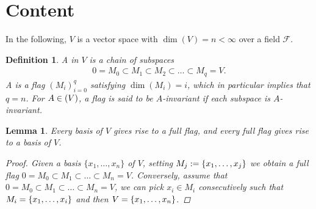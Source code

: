 \documentclass[10pt,twoside,openany,final]{memoir}
\theoremstyle{break}
\newtheorem{lemma}[section]{Lemma}
\newtheorem{definition}[section]{Definition}
\theoremstyle{Break}
\let\End\relax
\DeclareMathOperator{\End}{End}
\newcommand{\F}{\mathcal{F}}
\let\Span\relax
\DeclareMathOperator{\Span}{Span}
\let\emph\relax
\begin{document}
\section*{Content}
In the following, $V$ is a vector space with $\dim(V)=n< \infty$ over a field $\F$.

\begin{definition}
	A \emph{flag} in $V$ is a chain of subspaces 
	\begin{align*}
		0=M_0\subset M_1 \subset M_2 \subset \dots \subset M_q =V.
	\end{align*}
	A \emph{full flag} is a flag $(M_i)_{i=0}^q$ satisfying $\dim(M_i)=i$, which in particular implies that $q=n$. For $A \in \End(V)$, a flag is said to be $A$-invariant if each subspace is $A$-invariant.
\end{definition}
\begin{lemma}
	Every basis of $V$ gives rise to a full flag, and every full flag gives rise to a basis of $V$.
	\begin{proof}
		Given a basis $\{x_1,\dots,x_n\}$ of $V$, setting $M_j:=\Span\{x_1,\dots,x_j\}$ we obtain a full flag $0=M_0 \subset M_1 \subset\dots \subset M_n = V$. Conversely, assume that $0=M_0 \subset M_1 \subset\dots \subset M_n = V$, we can pick $x_i \in M_i$ consecutively such that $M_i=\Span\{x_1,\dots,x_i\}$ and then $V=\Span\{x_1,\dots,x_n\}$.
	\end{proof}
\end{lemma}
\end{document}
